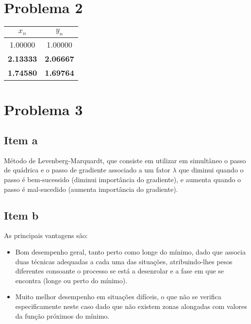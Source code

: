 {\section{Problema 2}


\begin{center}
    \begin{tabular}{c | c}
        $x_n$ & $y_n$ \\ \hline
        1.00000 & 1.00000 \\
        \textbf{2.13333} & \textbf{2.06667} \\
        \textbf{1.74580} & \textbf{1.69764}
    \end{tabular}
\end{center}

\section{Problema 3}
\subsection{Item a}
Método de Levenberg-Marquardt, que consiste em utilizar em simultâneo o passo de quádrica e o passo de gradiente associado a um fator $\lambda$ que diminui quando o passo é bem-sucessido (diminui importância do gradiente), e aumenta quando o passo é mal-sucedido (aumenta importância do gradiente).

\subsection{Item b}
As principais vantagens são:
\begin{itemize}
    \item Bom desempenho geral, tanto perto como longe do mínimo, dado que associa duas técnicas adequadas a cada uma das situações, atribuindo-lhes pesos diferentes consoante o processo se está a desenrolar e a fase em que se encontra (longe ou perto do mínimo).
    \item Muito melhor desempenho em situações difíceis, o que não se verifica especificamente neste caso dado que não existem zonas alongadas com valores da função próximos do mínimo.
\end{itemize}

}
